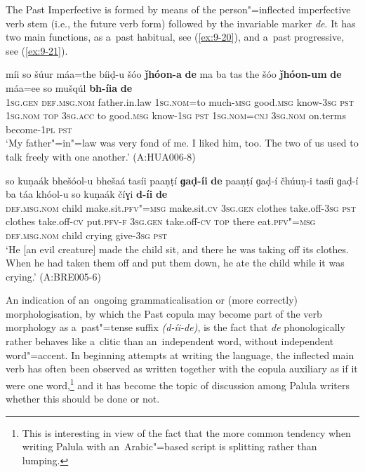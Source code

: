 The Past Imperfective is formed by means of the person"=inflected imperfective verb stem (i.e., the future verb form) followed by the invariable marker \textit{de}. It has two main functions, as a~past habitual, see (\ref{ex:9-20}), and a~past progressive, see (\ref{ex:9-21}).
\begin{exe}
\ex
\label{ex:9-20}
\gll míi so šúur máa=the bíiḍ-u šóo \textbf{ǰhóon-a} \textbf{de} ma ba tas the šóo \textbf{ǰhóon-um} \textbf{de} máa=ee so mušqúl \textbf{bh-íia} \textbf{de}\\
\textsc{1sg.gen} \textsc{def.msg.nom} father.in.law \textsc{1sg.nom=}to much-\textsc{msg} good.\textsc{msg} know-\textsc{3sg} \textsc{pst} \textsc{1sg.nom} \textsc{top} \textsc{3sg.acc}  to good.\textsc{msg} know-\textsc{1sg } \textsc{pst } \textsc{1sg.nom=cnj}  \textsc{3sg.nom} on.terms become-\textsc{1pl} \textsc{pst} \\
\glt `My father"=in"=law was very fond of me. I liked him, too. The two of us used to talk freely with one another.' (A:HUA006-8)

\ex
\label{ex:9-21}
\gll so kuṇaák bhešóol-u bhešaá tasíi paaṇṭí \textbf{ɡaḍ-íi} \textbf{de} paaṇṭí ɡaḍ-í čhúuṇ-i tasíi ɡaḍ-í ba táa khóol-u so kuṇaák číɣi \textbf{d-íi} \textbf{de} \\
\textsc{def.msg.nom} child make.sit.\textsc{pfv"=msg} make.sit.\textsc{cv} \textsc{3sg.gen}  clothes take.off-\textsc{3sg } \textsc{pst} clothes take.off-\textsc{cv} put.\textsc{pfv-f}  \textsc{3sg.gen} take.off-\textsc{cv} \textsc{top} there eat.\textsc{pfv"=msg}  \textsc{def.msg.nom} child crying give-\textsc{3sg} \textsc{pst} \\
\glt `He [an evil creature] made the child sit, and there he was taking off its clothes. When he had taken them off and put them down, he ate the child while it was crying.' (A:BRE005-6)
\end{exe}

An indication of an~ongoing grammaticalisation or (more correctly) morphologisation, by which the Past copula may become part of the verb morphology as a~past"=tense suffix \textit{(d-íi-de)}, is the fact that \textit{de} phonologically rather behaves like a~clitic than an~independent word, without independent word"=accent. In beginning attempts at writing the language, the inflected main verb has often been observed as written together with the copula auxiliary as if it were one word,\footnote{This is interesting in view of the fact that the more common tendency when writing Palula with an~Arabic"=based script is splitting rather than lumping.} and it has become the topic of discussion among Palula writers whether this should be done or not. 


